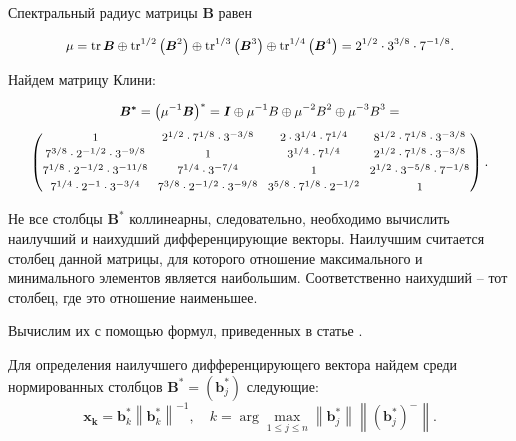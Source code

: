 \documentclass{math-mech-sci}
\begin{document}
Спектральный радиус матрицы $\boldsymbol{B}$  равен 
\vspace{-0.8ex}

$$
\small
\mu=\operatorname{tr} \boldsymbol{B} \oplus \operatorname{tr}^{1 / 2}\left(\boldsymbol{B}^2\right) \oplus \operatorname{tr}^{1 / 3}\left(\boldsymbol{B}^3\right)\oplus \operatorname{tr}^{1 / 4}\left(\boldsymbol{B}^4\right)={{2^ {1 / 2}} \cdot {3^ {3 / 8}}} \cdot  {{7^ {-1 / 8}}}.
$$
\vspace{-0.2ex}

Найдем матрицу Клини:

$$
\begin{aligned}
\small
\boldsymbol{B^*}=\left(\mu^{-1} \boldsymbol{B}\right)^*= \boldsymbol{I} \oplus \mu^{-1} B \oplus \mu^{-2} B^2\oplus \mu^{-3} B^3=
\end{aligned}
$$
\[
\setlength{\arraycolsep}{3.5pt}
\footnotesize
\begin{pmatrix}
			{1}{} & {{2^ {1 / 2}} \cdot {7^ {1 / 8}}} \cdot  {{3^ {-3 / 8}}} & {{2} \cdot {3^ {1 / 4}} \cdot {7^ {1 / 4}}} & {{8^ {1 / 2}} \cdot {7^ {1 / 8}}} \cdot {{3^ {-3 / 8}}} \\[0.5ex]
			{{7^ {3 / 8}}} \cdot {{2^ {- 1 / 2}} \cdot {3^ {-9 / 8}}} & {1}{} & {{3^ {1 / 4}}\cdot {7^ {1 / 4}}}{} & {{2^ {1 / 2}} \cdot {7^ {1 / 8}}} \cdot  {{3^ {-3 / 8}}} \\[0.5ex]
			{{7^ {1 / 8}}} \cdot  {{2^ {-1 / 2}} \cdot {3^ {-11 / 8}}} & {{7^ {1 / 4}}} \cdot  {{3^ {- 7 / 4}}} & {1}{} & {{2^ {1 / 2}}} \cdot  {{3^{-5/8} \cdot 7^ {-1 / 8}}} \\[0.5ex]
			{{7^ {1 / 4}}} \cdot  {{2^{-1}} \cdot {3^ {-3 / 4}}} & {{7^ {3 / 8}}} \cdot {{2^ {-1 / 2}} \cdot {3^ {-9 / 8}}} & {{3^{5/8} \cdot 7^ {1 / 8}}} \cdot {{2^ {-1 / 2}}} & {1}{} \\
\end{pmatrix}.
\]
\vspace{0.7ex}

Не все столбцы $\boldsymbol{B^*}$ коллинеарны, следовательно,  необходимо вычислить наилучший  и наихудший дифференцирующие векторы. Наилучшим считается столбец данной матрицы, для которого отношение максимального и минимального элементов является наибольшим. Соответственно наихудший -- тот столбец, где это отношение наименьшее.
\vspace{0.5ex}

Вычислим их с помощью формул, приведенных в статье \cite{Krivulin2024Application}.
\vspace{0.5ex}

 Для определения наилучшего дифференцирующего вектора найдем среди нормированных столбцов $\boldsymbol{B^*} = (\boldsymbol{b}_j^*)$ следующие:
 $$
\boldsymbol{x_k}=\boldsymbol{b}_k^*\left\|\boldsymbol{b}_k^*\right\|^{-1}, \quad k=\arg \max _{1 \leq j \leq n}\left\|\boldsymbol{b}_j^*\right\|\left\|\left(\boldsymbol{b}_j^*\right)^{-}\right\|.
 $$
\end{document}
